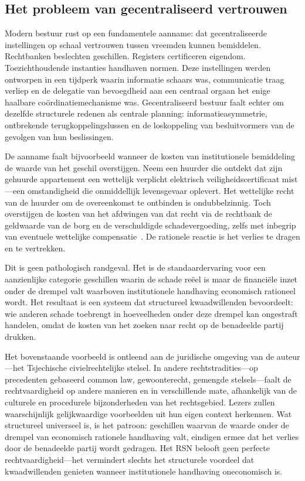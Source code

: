 \documentclass[11pt,a4paper,twocolumn]{article}
\begin{document}
\subsection{Het probleem van gecentraliseerd vertrouwen}

Modern bestuur rust op een fundamentele aanname: dat gecentraliseerde instellingen op schaal vertrouwen tussen vreemden kunnen bemiddelen. Rechtbanken beslechten geschillen. Registers certificeren eigendom. Toezichthoudende instanties handhaven normen. Deze instellingen werden ontworpen in een tijdperk waarin informatie schaars was, communicatie traag verliep en de delegatie van bevoegdheid aan een centraal orgaan het enige haalbare coördinatiemechanisme was. Gecentraliseerd bestuur faalt echter om dezelfde structurele redenen als centrale planning: informatieasymmetrie, ontbrekende terugkoppelingslussen en de loskoppeling van besluitvormers van de gevolgen van hun beslissingen.

De aanname faalt bijvoorbeeld wanneer de kosten van institutionele bemiddeling de waarde van het geschil overstijgen. Neem een huurder die ontdekt dat zijn gehuurde appartement een wettelijk verplicht elektrisch veiligheidscertificaat mist---een omstandigheid die onmiddellijk levensgevaar oplevert. Het wettelijke recht van de huurder om de overeenkomst te ontbinden is ondubbelzinnig. Toch overstijgen de kosten van het afdwingen van dat recht via de rechtbank de geldwaarde van de borg en de verschuldigde schadevergoeding, zelfs met inbegrip van eventuele wettelijke compensatie~\cite{czcourtfees}. De rationele reactie is het verlies te dragen en te vertrekken.

Dit is geen pathologisch randgeval. Het is de standaardervaring voor een aanzienlijke categorie geschillen waarin de schade reëel is maar de financiële inzet onder de drempel valt waarboven institutionele handhaving economisch rationeel wordt. Het resultaat is een systeem dat structureel kwaadwillenden bevoordeelt: wie anderen schade toebrengt in hoeveelheden onder deze drempel kan ongestraft handelen, omdat de kosten van het zoeken naar recht op de benadeelde partij drukken.

Het bovenstaande voorbeeld is ontleend aan de juridische omgeving van de auteur---het Tsjechische civielrechtelijke stelsel. In andere rechtstradities---op precedenten gebaseerd common law, gewoonterecht, gemengde stelsels---faalt de rechtvaardigheid op andere manieren en in verschillende mate, afhankelijk van de culturele en procedurele bijzonderheden van het rechtsgebied. Lezers zullen waarschijnlijk gelijkwaardige voorbeelden uit hun eigen context herkennen. Wat structureel universeel is, is het patroon: geschillen waarvan de waarde onder de drempel van economisch rationele handhaving valt, eindigen ermee dat het verlies door de benadeelde partij wordt gedragen. Het RSN belooft geen perfecte rechtvaardigheid---het vermindert slechts het structurele voordeel dat kwaadwillenden genieten wanneer institutionele handhaving oneconomisch is.
\end{document}
